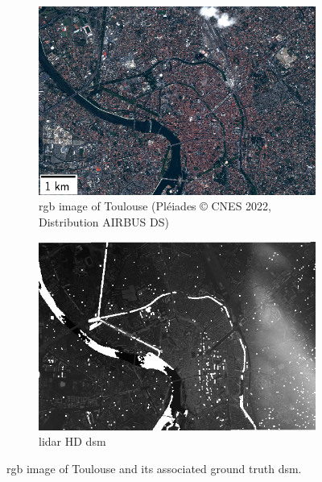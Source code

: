 \begin{figure}
    \centering
    \begin{subfigure}[t]{0.48\linewidth}
        \flushleft
        \includegraphics[width=\linewidth]{Images/Chap_6/miniature_Toulouse.png}
        \caption{\acrshort{rgb} image of Toulouse (Pléiades © CNES 2022, Distribution AIRBUS DS)}
        \label{fig:miniature_Toulouse_rgb}
    \end{subfigure}\hfill
    \begin{subfigure}[t]{0.48\linewidth}
        \flushright
        \includegraphics[width=\linewidth]{Images/Chap_6/miniature_Toulouse_gt.png}
        \caption{\acrshort{lidar} HD \acrshort{dsm}}
        \label{fig:miniature_Toulouse_gt}
    \end{subfigure}
    \caption{\acrshort{rgb} image of Toulouse and its associated ground truth \acrshort{dsm}.}
    \label{fig:miniature_Toulouse}
\end{figure}

